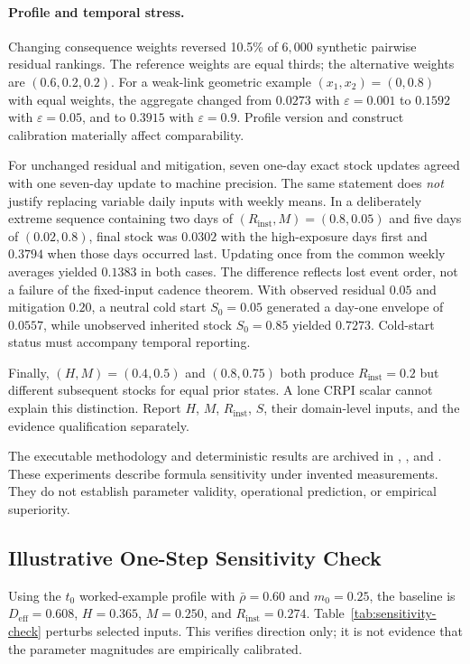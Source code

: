\documentclass[11pt]{article}
\begin{document}
\paragraph{Profile and temporal stress.}
Changing consequence weights reversed 10.5\% of $6{,}000$ synthetic
pairwise residual rankings. The reference weights are equal thirds;
the alternative weights are $(0.6,0.2,0.2)$. For a weak-link
geometric example $(x_1,x_2)=(0,0.8)$ with equal weights, the aggregate changed
from $0.0273$ with $\varepsilon=0.001$ to $0.1592$ with $\varepsilon=0.05$,
and to $0.3915$ with $\varepsilon=0.9$. Profile version and construct
calibration materially affect comparability.

For unchanged residual and mitigation, seven one-day exact stock updates
agreed with one seven-day update to machine precision. The same statement
does \emph{not} justify replacing variable daily inputs with weekly means.
In a deliberately extreme sequence containing two days of
$(R_{\mathrm{inst}},M)=(0.8,0.05)$ and five days of $(0.02,0.8)$, final
stock was $0.0302$ with the high-exposure days first and $0.3794$ when
those days occurred last. Updating once from the common weekly averages
yielded $0.1383$ in both cases. The difference reflects lost event order,
not a failure of the fixed-input cadence theorem. With observed residual
$0.05$ and mitigation $0.20$, a neutral cold start $S_0=0.05$ generated
a day-one envelope of $0.0557$, while unobserved inherited stock $S_0=0.85$
yielded $0.7273$. Cold-start status must accompany temporal reporting.

Finally, $(H,M)=(0.4,0.5)$ and $(0.8,0.75)$ both produce
$R_{\mathrm{inst}}=0.2$ but different subsequent stocks for equal prior
states. A lone CRPI scalar cannot explain this distinction. Report
$H$, $M$, $R_{\mathrm{inst}}$, $S$, their domain-level inputs, and
the evidence qualification separately.

The executable methodology and deterministic results are archived in
,
, and
. These experiments describe
formula sensitivity under invented measurements. They do not establish
parameter validity, operational prediction, or empirical superiority.

\subsection{Illustrative One-Step Sensitivity Check}
Using the $t_0$ worked-example profile with $\bar\rho=0.60$ and $m_0=0.25$, the baseline
is $D_{\mathrm{eff}}=0.608$, $H=0.365$, $M=0.250$, and
$R_{\mathrm{inst}}=0.274$. Table~\ref{tab:sensitivity-check} perturbs selected inputs.
This verifies direction only; it is not evidence that the parameter magnitudes are
empirically calibrated.
\end{document}

